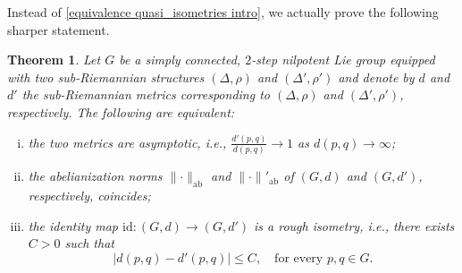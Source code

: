 \documentclass[a4paper,11pt,reqno]{amsart}
\theoremstyle{plain}
\newtheorem{theorem}{Theorem}[section]
\theoremstyle{definition}
\newcommand{\g}{\mathfrak{g}}
\begin{document}

Instead of \cref{equivalence quasi_isometries intro}, we actually prove the following sharper statement.

 \begin{theorem} \label{equivalence quasi_isometries}
 Let $G$ be a simply connected, $2$-step nilpotent Lie group equipped with two sub-Riemannian structures $(\Delta,\rho)$ and $(\Delta',\rho')$ and denote by $d$ and $d'$ the sub-Riemannian metrics corresponding to $(\Delta,\rho)$ and $(\Delta',\rho')$, respectively. The following are equivalent:
 \begin{enumerate}[(i)]
 \item the two metrics are asymptotic, i.e., $\frac{d'(p,q)}{d(p,q)} \to 1$ as $d(p,q) \to \infty$;
 \item the abelianization norms $\lVert \cdot \rVert_\mathrm{ab}$ and $\lVert \cdot \rVert'_\mathrm{ab}$ of $(G,d)$ and $(G,d')$, respectively, coincides;
 \item the identity map $\mathrm{id} \colon (G,d) \to (G,d')$ is a rough isometry, i.e., there exists $C>0$ such that $$\lvert d(p,q) - d'(p,q) \rvert \le C, \quad \text{for every $p,q \in G$.}$$
 \end{enumerate}
 \end{theorem}
\end{document}
